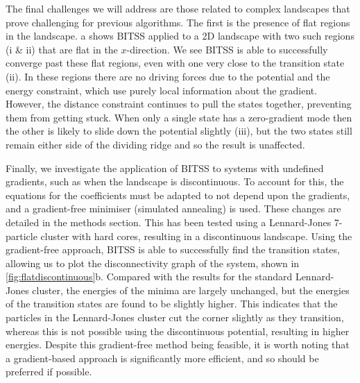 \documentclass[twocolumn,10pt]{revtex4}
\begin{document}
The final challenges we will address are those related to complex landscapes that prove challenging for previous algorithms.
The first is the presence of flat regions in the landscape.
a shows BITSS applied to a 2D landscape with two such regions (i \& ii) that are flat in the $x$-direction.
We see BITSS is able to successfully converge past these flat regions, even with one very close to the transition state (ii).
In these regions there are no driving forces due to the potential and the energy constraint, which use purely local information about the gradient.
However, the distance constraint continues to pull the states together, preventing them from getting stuck.
When only a single state has a zero-gradient mode then the other is likely to slide down the potential slightly (iii), but the two states still remain either side of the dividing ridge and so the result is unaffected.

Finally, we investigate the application of BITSS to systems with undefined gradients, such as when the landscape is discontinuous.
To account for this, the equations for the coefficients must be adapted to not depend upon the gradients, and a gradient-free minimiser (simulated annealing) is used.
These changes are detailed in the methods section.
This has been tested using a Lennard-Jones 7-particle cluster with hard cores, resulting in a discontinuous landscape.
Using the gradient-free approach, BITSS is able to successfully find the transition states, allowing us to plot the disconnectivity graph of the system, shown in \cref{fig:flatdiscontinuous}b.
Compared with the results for the standard Lennard-Jones cluster, the energies of the minima are largely unchanged, but the energies of the transition states are found to be slightly higher.
This indicates that the particles in the Lennard-Jones cluster cut the corner slightly as they transition, whereas this is not possible using the discontinuous potential, resulting in higher energies.
Despite this gradient-free method being feasible, it is worth noting that a gradient-based approach is significantly more efficient, and so should be preferred if possible.
\end{document}
